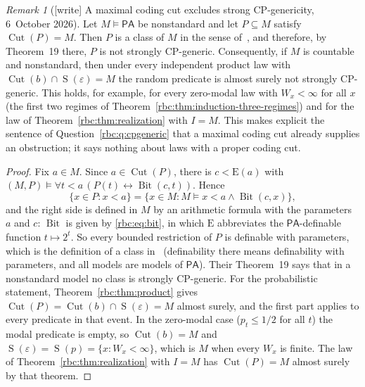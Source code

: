 \documentclass[11pt]{article}
\numberwithin{equation}{section}
\theoremstyle{definition}
\theoremstyle{remark}
\newtheorem{remark}[theorem]{Remark}
\newcommand{\PA}{\mathsf{PA}}
\newcommand{\E}{\mathrm E}
\newcommand{\Bit}{\operatorname{Bit}}
\newcommand{\Cut}{\operatorname{Cut}}
\newcommand{\SumCut}{\operatorname{S}}
\begin{document}
\begin{remark}[{[write]} A maximal coding cut excludes strong CP-genericity, 6~October 2026]\label{rbc:rem:cp-class}
Let $M\models\PA$ be nonstandard and let $P\subseteq M$ satisfy
$\Cut(P)=M$. Then $P$ is a class of $M$ in the sense
of~\cite{abdul-quader-schmerl}, and therefore, by Theorem~19 there, $P$ is
not strongly CP-generic. Consequently, if $M$ is countable and nonstandard,
then under every independent product law with
$\Cut(b)\cap\SumCut(\varepsilon)=M$ the random predicate is almost surely
not strongly CP-generic. This holds, for example, for every zero-modal law
with $W_x<\infty$ for all $x$ (the first two regimes of
Theorem~\ref{rbc:thm:induction-three-regimes}) and for the law of
Theorem~\ref{rbc:thm:realization} with $I=M$. This makes explicit the
sentence of Question~\ref{rbc:q:cpgeneric} that a maximal coding cut
already supplies an obstruction; it says nothing about laws with a proper
coding cut.
\end{remark}

\begin{proof}
Fix $a\in M$. Since $a\in\Cut(P)$, there is $c<\E(a)$ with
$(M,P)\models\forall t<a\,(P(t)\leftrightarrow\Bit(c,t))$. Hence
\[
 \{x\in P:x<a\}=\{x\in M:M\models x<a\wedge\Bit(c,x)\},
\]
and the right side is defined in $M$ by an arithmetic formula with the
parameters $a$ and $c$: $\Bit$ is given by \eqref{rbc:eq:bit}, in which $\E$
abbreviates the $\PA$-definable function $t\mapsto2^t$. So every bounded
restriction of $P$ is definable with parameters, which is the definition of
a class in~\cite{abdul-quader-schmerl} (definability there means
definability with parameters, and all models are models of $\PA$). Their
Theorem~19 says that in a nonstandard model no class is strongly
CP-generic. For the probabilistic statement, Theorem~\ref{rbc:thm:product}
gives $\Cut(P)=\Cut(b)\cap\SumCut(\varepsilon)=M$ almost surely, and the
first part applies to every predicate in that event. In the zero-modal case
($p_t\le1/2$ for all $t$) the modal predicate is empty, so $\Cut(b)=M$ and
$\SumCut(\varepsilon)=\SumCut(p)=\{x:W_x<\infty\}$, which is $M$ when every
$W_x$ is finite. The law of Theorem~\ref{rbc:thm:realization} with $I=M$
has $\Cut(P)=M$ almost surely by that theorem.
\end{proof}
\end{document}
